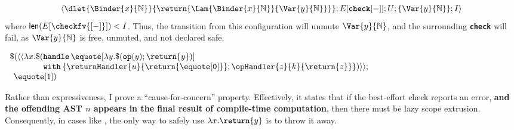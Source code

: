 \[\langle \dlet{\Binder{x}{\mathbb{N}}}{\return{\Lam{\Binder{x}{\mathbb{N}}}{\Var{y}{\mathbb{N}}}}}; E[\textbf{\texttt{check}}[-]]; U; \{\Var{y}{\mathbb{N}}\} ; I \rangle\]
where $\textsf{len}(E[\checkfv{[-]}]) < I$. Thus, the transition from this configuration will unmute $\Var{y}{\mathbb{N}}$, and the surrounding \textbf{\texttt{check}} will fail, as $\Var{y}{\mathbb{N}}$ is free, unmuted, and not declared safe.

\begin{code}
  \begin{source}
    $
    \begin{array}{l}
      \$(\langle \langle \lambda x. \$ (\textbf{\texttt{handle}} \, \equote[{\lambda y. \$(\textbf{\texttt{op}}(y); \return{y})}]\\
      \quad\quad\quad\quad\textbf{\texttt{with}} \, \{ \returnHandler{u}{\return{\equote[\texttt{0}]}}; \opHandler{z}{k}{\return{z}}\})\rangle\rangle;\\
      \;\, \equote[{\texttt{1}}])
    \end{array}
    $
  \end{source}
  \label{listing:best-effort-imperfect}
\end{code}

Rather than expressiveness, I prove a ``cause-for-concern'' property. Effectively, it states that if the best-effort check reports an error, \textbf{and the offending AST $n$ appears in the final result of compile-time computation}, then there must be lazy scope extrusion. Consequently, in cases like , the only way to safely use $\lambda x.\return{y}$ is to throw it away. 


